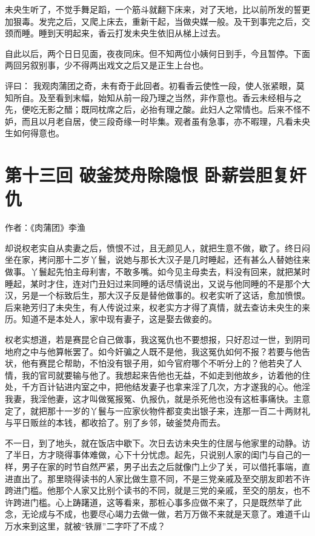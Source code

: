 \documentclass[a4paper,12pt,UTF8,twoside]{ctexbook}
\begin{document}
未央生听了，不觉手舞足蹈，一个筋斗就翻下床来，对了天地，比以前所发的誓更加狠毒。发完之后，又爬上床去，重新干起，当做央媒一般。及干到事完之后，交颈而睡。睡到天明起来，香云打发未央生依旧从梯上过去。

自此以后，两个日日见面，夜夜同床。但不知两位小姨何日到手，今且暂停。下面两回另叙别事，少不得两出戏文之后又是正生上台也。

评曰： 我观肉蒲团之奇，未有奇于此回者。初看香云使性一段，使人张紧眼，莫知所自。及至看到末幅，始知从前一段乃理之当然，非作意也。香云未经相与之先，便吃无影之醋；既同枕席之后，必抬有理之酸。此妇人之常情也。后来不怪不妒，而且以月老自居，使三段奇缘一时毕集。观者虽有急事，亦不暇理，凡看未央生如何得意也。

\chapter{第十三回 破釜焚舟除隐恨 卧薪尝胆复奸仇}

作者：《肉蒲团》李渔

却说权老实自从卖妻之后，愤恨不过，且无颜见人，就把生意不做，歇了。终日闷坐在家，拷问那十二岁丫鬟，说她与那长大汉子是几时睡起，还有甚么人替她往来做事。丫鬟起先怕主母利害，不敢多嘴。如今见主母卖去，料没有回来，就把某时睡起，某时才住，连对门丑妇过来同睡的话尽情说出，又说与他同睡的不是那个大汉，另是一个标致后生，那大汉子反是替他做事的。权老实听了这话，愈加愤恨。后来艳芳归了未央生，有人传说过来，权老实方才得了真情，就去查访未央生的来历。知道不是本处人，家中现有妻子，这是娶去做妾的。

权老实想道，若是赛昆仑自己做事，我这冤仇也不要想报，只好忍过一世，到阴司地府之中与他算帐罢了。如今奸骗之人既不是他，我这冤仇如何不报？若要与他告状，他有赛昆仑帮助，不怕没有银子用，如今官府哪个不听分上的？他若央了人情，我的官司就要输与他了。我想起来告他也无益，不如走到他故乡，访着他的住处，千方百计钻进内室之中，把他结发妻子也拿来淫了几次，方才遂我的心。他淫我妻，我淫他妻，这才叫做冤报冤、仇报仇，就是杀死他也没有这桩事痛快。主意定了，就把那十一岁的丫鬟与一应家伙物件都变卖出银子来，连那一百二十两财礼与平日贩丝的本钱，都收拾了。别了乡邻，破釜焚舟而去。

不一日，到了地头，就在饭店中歇下。次日去访未央生的住居与他家里的动静。访了半日，方才晓得事体难做，心下十分忧虑。起先，只说别人家的闺门与自己的一样，男子在家的时节自然严紧，男子出去之后就像门上少了关，可以借托事端，直进直出了。那里晓得读书的人家比做生意不同，不是三党亲戚及至交朋友即若不许跨进门槛。他那个人家又比别个读书的不同，就是三党的亲戚，至交的朋友，也不许跨进门槛。心上踌躇道，这等看来，那桩心事多应做不来了，只是既然举了此念，无论成与不成，也要尽心竭力去做一做，若万万做不来就是天意了。难道千山万水来到这里，就被“铁扉”二字吓了不成？
\end{document}
